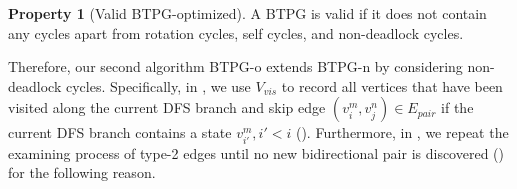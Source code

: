 \documentclass[letterpaper]{article} %
\theoremstyle{definition}
\newtheorem{property}{Property}
\begin{document}
\begin{property}[Valid BTPG-optimized]\label{pro:BTPG-o}
A BTPG is valid if it does not contain any cycles apart from rotation cycles, self cycles, and non-deadlock cycles.    
\end{property}

Therefore, our second algorithm BTPG-o extends BTPG-n by considering non-deadlock cycles. Specifically, in , we use $V_{vis}$ to record all vertices that have been visited along the current DFS branch and skip edge $(v_i^m, v_j^n) \in E_{pair}$ if the current DFS branch contains a state $v_{i'}^m, i'<i$ (). Furthermore, in , we repeat the examining process of type-2 edges until no new bidirectional pair is discovered () for the following reason.




        
\end{document}
